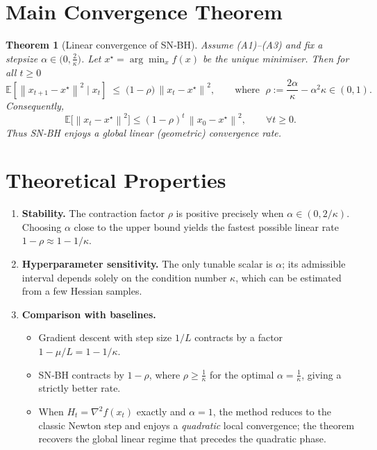 \documentclass{article}
\newtheorem{theorem}{Theorem}
\newcommand{\E}{\mathbb{E}}
\newcommand{\norm}[1]{\left\lVert #1\right\rVert}
\begin{document}
\section*{Main Convergence Theorem}
\begin{theorem}[Linear convergence of SN‑BH]\label{thm:linear}
Assume (A1)–(A3) and fix a stepsize $\alpha\in\bigl(0,\frac{2}{\kappa}\bigr)$.  
Let $x^{\star}=\arg\min_{x}f(x)$ be the unique minimiser. Then for all $t\ge0$
\begin{equation}
   \E\!\left[\norm{x_{t+1}-x^{\star}}^{2}\mid x_t\right]
   \;\le\;
   \bigl(1-\rho\bigr)\,\norm{x_t-x^{\star}}^{2},
   \qquad\text{where }\;
   \rho:=\frac{2\alpha}{\kappa}-\alpha^{2}\kappa \in(0,1). \tag{T1}
\end{equation}
Consequently,
\begin{equation}
   \E\!\bigl[\norm{x_{t}-x^{\star}}^{2}\bigr]
   \le(1-\rho)^{t}\,\norm{x_{0}-x^{\star}}^{2},
   \qquad\forall t\ge0. \tag{T2}
\end{equation}
Thus SN‑BH enjoys a global linear (geometric) convergence rate.
\end{theorem}

\section*{Theoretical Properties}
\begin{enumerate}[label=\arabic*.]
\item \textbf{Stability.} The contraction factor $\rho$ is positive precisely when
$\alpha\in(0,2/\kappa)$. Choosing $\alpha$ close to the upper bound yields the
fastest possible linear rate $1-\rho\approx 1-1/\kappa$.
\item \textbf{Hyperparameter sensitivity.} The only tunable scalar is $\alpha$;
its admissible interval depends solely on the condition number $\kappa$,
which can be estimated from a few Hessian samples.
\item \textbf{Comparison with baselines.}
\begin{itemize}
    \item Gradient descent with step size $1/L$ contracts by a factor $1-\mu/L=1-1/\kappa$.
    \item SN‑BH contracts by $1-\rho$, where $\rho\ge\frac{1}{\kappa}$ for the optimal
          $\alpha=\frac{1}{\kappa}$, giving a strictly better rate.
    \item When $H_t=\nabla^{2}f(x_t)$ exactly and $\alpha=1$, the method reduces to the classic Newton step and enjoys a \emph{quadratic} local convergence; the theorem recovers the global linear regime that precedes the quadratic phase.
\end{itemize}
\end{enumerate}
\end{document}

